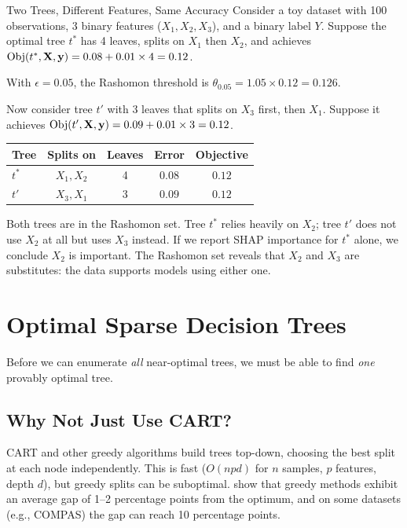 \begin{workedexample}{Two Trees, Different Features, Same Accuracy}
Consider a toy dataset with 100 observations, 3 binary features
($X_1, X_2, X_3$), and a binary label $Y$.  Suppose the optimal tree $t^*$
has 4 leaves, splits on $X_1$ then $X_2$, and achieves
$\operatorname{Obj}(t^*, \mathbf{X}, \mathbf{y}) = 0.08 + 0.01 \times 4 = 0.12$.

With $\epsilon = 0.05$, the Rashomon threshold is $\theta_{0.05} = 1.05
\times 0.12 = 0.126$.

Now consider tree $t'$ with 3 leaves that splits on $X_3$ first, then $X_1$.
Suppose it achieves $\operatorname{Obj}(t', \mathbf{X}, \mathbf{y}) = 0.09 + 0.01 \times 3
= 0.12$.

\begin{center}
\begin{tabular}{lcccc}
\toprule
Tree & Splits on & Leaves & Error & Objective \\
\midrule
$t^*$ & $X_1, X_2$ & 4 & $0.08$ & $0.12$ \\
$t'$ & $X_3, X_1$ & 3 & $0.09$ & $0.12$ \\
\bottomrule
\end{tabular}
\end{center}

Both trees are in the Rashomon set.  Tree $t^*$ relies heavily on $X_2$;
tree $t'$ does not use $X_2$ at all but uses $X_3$ instead.  If we report
SHAP importance for $t^*$ alone, we conclude $X_2$ is important.  The
Rashomon set reveals that $X_2$ and $X_3$ are substitutes: the data supports
models using either one.
\end{workedexample}


\section{Optimal Sparse Decision Trees}\label{sec:rashomon:optimal-trees}

Before we can enumerate \emph{all} near-optimal trees, we must be able to
find \emph{one} provably optimal tree.

\subsection{Why Not Just Use CART?}

CART \citep{Breiman1984} and other greedy algorithms build trees top-down,
choosing the best split at each node independently.  This is fast
($O(npd)$ for $n$ samples, $p$ features, depth $d$), but greedy splits can
be suboptimal.  \citet{BabbarEtAl2025} show that greedy methods exhibit
an average gap of 1--2 percentage points from the optimum, and on some
datasets (e.g., COMPAS) the gap can reach 10 percentage points.

